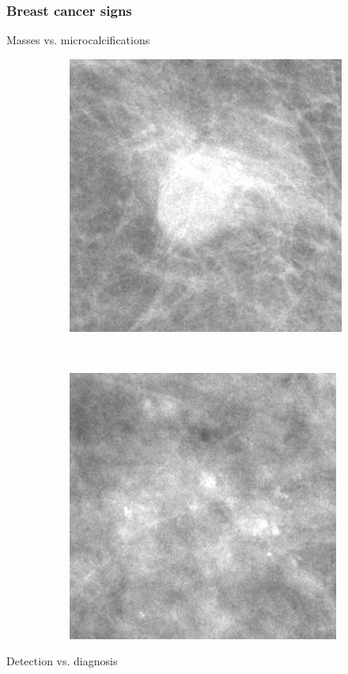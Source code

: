 \documentclass{beamer}
\begin{document}
	\begin{frame}
		\frametitle{Breast cancer signs}
		Masses vs. microcalcifications
		\begin{figure}[h]
			\centering
			\begin{subfigure}{0.35\textwidth}
				\includegraphics[width=\textwidth]{plots/breastMass.jpg}
			\end{subfigure}
			~
			\begin{subfigure}{0.35\textwidth}
				\includegraphics[width=\textwidth]{plots/breastMicrocalcification.jpg}
			\end{subfigure}
		\end{figure}

		Detection vs. diagnosis
	\end{frame}
	
\end{document}
